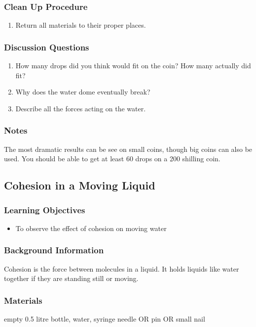 \subsubsection*{Clean Up Procedure}
\begin{enumerate}
\item{Return all materials to their proper places.}
\end{enumerate}

\subsubsection*{Discussion Questions}
\begin{enumerate}
\item{How many drops did you think would fit on the coin? How many actually did fit?}
\item{Why does the water dome eventually break?}
\item{Describe all the forces acting on the water.}
\end{enumerate}

\subsubsection*{Notes}
The most dramatic results can be see on small coins, though big coins can also be used. You should be able to get at least 60 drops on a 200 shilling coin.

\subsection{Cohesion in a Moving Liquid}

\subsubsection*{Learning Objectives}
\begin{itemize}
\item{To observe the effect of cohesion on moving water}
\end{itemize}

\subsubsection*{Background Information}
Cohesion is the force between molecules in a liquid. It holds liquids like water together if they are standing still or moving.

\subsubsection*{Materials}
empty 0.5 litre bottle, water, syringe needle OR pin OR small nail

